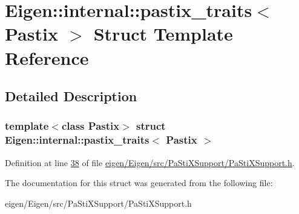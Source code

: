 \hypertarget{struct_eigen_1_1internal_1_1pastix__traits}{}\section{Eigen\+:\+:internal\+:\+:pastix\+\_\+traits$<$ Pastix $>$ Struct Template Reference}
\label{struct_eigen_1_1internal_1_1pastix__traits}


\subsection{Detailed Description}
\subsubsection*{template$<$class Pastix$>$\newline
struct Eigen\+::internal\+::pastix\+\_\+traits$<$ Pastix $>$}



Definition at line \hyperlink{eigen_2_eigen_2src_2_pa_sti_x_support_2_pa_sti_x_support_8h_source_l00038}{38} of file \hyperlink{eigen_2_eigen_2src_2_pa_sti_x_support_2_pa_sti_x_support_8h_source}{eigen/\+Eigen/src/\+Pa\+Sti\+X\+Support/\+Pa\+Sti\+X\+Support.\+h}.



The documentation for this struct was generated from the following file\+:\begin{DoxyCompactItemize}
\item 
eigen/\+Eigen/src/\+Pa\+Sti\+X\+Support/\+Pa\+Sti\+X\+Support.\+h\end{DoxyCompactItemize}
